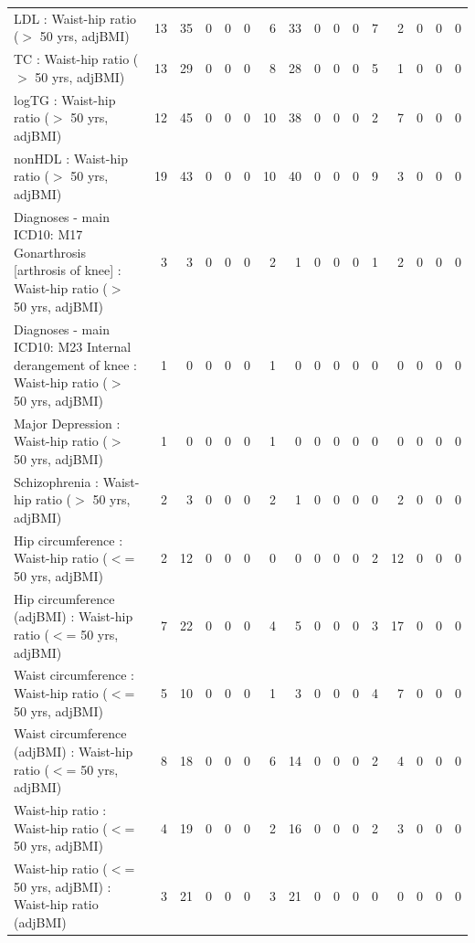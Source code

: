 \begin{table}[ht]
\begin{tabular}{lrrrrrrrrrrrrrrr}
  LDL : Waist-hip ratio ($>$ 50 yrs, adjBMI) &  13 &  35 &   0 &   0 &   0 &   6 &  33 &   0 &   0 &   0 &   7 &   2 &   0 &   0 &   0 \\ 
  TC : Waist-hip ratio ($>$ 50 yrs, adjBMI) &  13 &  29 &   0 &   0 &   0 &   8 &  28 &   0 &   0 &   0 &   5 &   1 &   0 &   0 &   0 \\ 
  logTG : Waist-hip ratio ($>$ 50 yrs, adjBMI) &  12 &  45 &   0 &   0 &   0 &  10 &  38 &   0 &   0 &   0 &   2 &   7 &   0 &   0 &   0 \\ 
  nonHDL : Waist-hip ratio ($>$ 50 yrs, adjBMI) &  19 &  43 &   0 &   0 &   0 &  10 &  40 &   0 &   0 &   0 &   9 &   3 &   0 &   0 &   0 \\ 
  Diagnoses - main ICD10: M17 Gonarthrosis [arthrosis of knee] : Waist-hip ratio ($>$ 50 yrs, adjBMI) &   3 &   3 &   0 &   0 &   0 &   2 &   1 &   0 &   0 &   0 &   1 &   2 &   0 &   0 &   0 \\ 
  Diagnoses - main ICD10: M23 Internal derangement of knee : Waist-hip ratio ($>$ 50 yrs, adjBMI) &   1 &   0 &   0 &   0 &   0 &   1 &   0 &   0 &   0 &   0 &   0 &   0 &   0 &   0 &   0 \\ 
  Major Depression : Waist-hip ratio ($>$ 50 yrs, adjBMI) &   1 &   0 &   0 &   0 &   0 &   1 &   0 &   0 &   0 &   0 &   0 &   0 &   0 &   0 &   0 \\ 
  Schizophrenia : Waist-hip ratio ($>$ 50 yrs, adjBMI) &   2 &   3 &   0 &   0 &   0 &   2 &   1 &   0 &   0 &   0 &   0 &   2 &   0 &   0 &   0 \\ 
  Hip circumference  : Waist-hip ratio ($<$= 50 yrs, adjBMI) &   2 &  12 &   0 &   0 &   0 &   0 &   0 &   0 &   0 &   0 &   2 &  12 &   0 &   0 &   0 \\ 
  Hip circumference (adjBMI) : Waist-hip ratio ($<$= 50 yrs, adjBMI) &   7 &  22 &   0 &   0 &   0 &   4 &   5 &   0 &   0 &   0 &   3 &  17 &   0 &   0 &   0 \\ 
  Waist circumference  : Waist-hip ratio ($<$= 50 yrs, adjBMI) &   5 &  10 &   0 &   0 &   0 &   1 &   3 &   0 &   0 &   0 &   4 &   7 &   0 &   0 &   0 \\ 
  Waist circumference (adjBMI) : Waist-hip ratio ($<$= 50 yrs, adjBMI) &   8 &  18 &   0 &   0 &   0 &   6 &  14 &   0 &   0 &   0 &   2 &   4 &   0 &   0 &   0 \\ 
  Waist-hip ratio  : Waist-hip ratio ($<$= 50 yrs, adjBMI) &   4 &  19 &   0 &   0 &   0 &   2 &  16 &   0 &   0 &   0 &   2 &   3 &   0 &   0 &   0 \\ 
  Waist-hip ratio ($<$= 50 yrs, adjBMI) : Waist-hip ratio (adjBMI) &   3 &  21 &   0 &   0 &   0 &   3 &  21 &   0 &   0 &   0 &   0 &   0 &   0 &   0 &   0 \\ 

\end{tabular}
\end{table}
